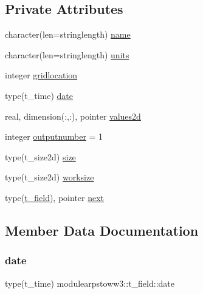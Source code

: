 \subsection*{Private Attributes}
\begin{DoxyCompactItemize}
\item 
character(len=stringlength) \mbox{\hyperlink{structmodulearpstoww3_1_1t__field_abcdfb2d85b2f4cc70b4ab0b22b7de1e4}{name}}
\item 
character(len=stringlength) \mbox{\hyperlink{structmodulearpstoww3_1_1t__field_aabb253beef79d920dc3e9911509e9e0f}{units}}
\item 
integer \mbox{\hyperlink{structmodulearpstoww3_1_1t__field_a69934ca78b766358a87c49edd52308ca}{gridlocation}}
\item 
type(t\+\_\+time) \mbox{\hyperlink{structmodulearpstoww3_1_1t__field_a2e4643ec56dfe18d11c2d5f4ac9e34e1}{date}}
\item 
real, dimension(\+:,\+:), pointer \mbox{\hyperlink{structmodulearpstoww3_1_1t__field_a266c31169e0888fe618856871c0bd5aa}{values2d}}
\item 
integer \mbox{\hyperlink{structmodulearpstoww3_1_1t__field_ad6b0d06d10deec9e496b299669e5ad93}{outputnumber}} = 1
\item 
type(t\+\_\+size2d) \mbox{\hyperlink{structmodulearpstoww3_1_1t__field_a5b46444f5e2fdcba58870ff01573d23d}{size}}
\item 
type(t\+\_\+size2d) \mbox{\hyperlink{structmodulearpstoww3_1_1t__field_ada6e07c18b34f7a52b243cdf7542d79d}{worksize}}
\item 
type(\mbox{\hyperlink{structmodulearpstoww3_1_1t__field}{t\+\_\+field}}), pointer \mbox{\hyperlink{structmodulearpstoww3_1_1t__field_a4700fe36f1bcb479f1ab4ebe12ad8c3e}{next}}
\end{DoxyCompactItemize}


\subsection{Member Data Documentation}
\mbox{\label{structmodulearpstoww3_1_1t__field_a2e4643ec56dfe18d11c2d5f4ac9e34e1}} 
\subsubsection{\texorpdfstring{date}{date}}
{\footnotesize\ttfamily type(t\+\_\+time) modulearpstoww3\+::t\+\_\+field\+::date\hspace{0.3cm}{\ttfamily [private]}}

